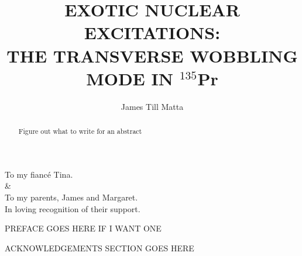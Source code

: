 \documentclass[final,numrefs,sort&compress]{nddiss2e}
\newcommand{\pr}{$^{135}$Pr}
\begin{document}
\frontmatter 
\title{EXOTIC NUCLEAR EXCITATIONS:\\
THE TRANSVERSE WOBBLING MODE IN \pr{}}
\author{James Till Matta}

\maketitle
%
%

\makecopyright

\begin{abstract}
  Figure out what to write for an abstract
\end{abstract}

\renewcommand{\dedicationname}{DEDICATED TO:}

\begin{dedication}
	To my fianc\'e Tina. \\\&\\To my parents, James and Margaret.\\
	In loving recognition of their support.
\end{dedication}

\tableofcontents
\listoffigures
\listoftables

\begin{preface}
  PREFACE GOES HERE IF I WANT ONE
\end{preface}

\begin{acknowledge}
  ACKNOWLEDGEMENTS SECTION GOES HERE
\end{acknowledge}

\begin{symbols}
\end{symbols}

\mainmatter
%
%
\end{document}
